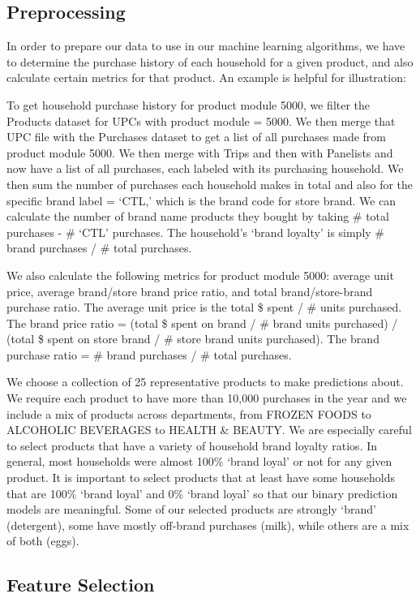 \documentclass[conference]{IEEEtran}
\begin{document}
\subsection{Preprocessing}
In order to prepare our data to use in our machine learning algorithms, we have to determine the purchase history of each household for a given product, and also calculate certain metrics for that product. An example is helpful for illustration: 

To get household purchase history for product module 5000, we filter the Products dataset for UPCs with product module = 5000. We then merge that UPC file with the Purchases dataset to get a list of all purchases made from product module 5000. We then merge with Trips and then with Panelists and now have a list of all purchases, each labeled with its purchasing household. We then sum the number of purchases each household makes in total and also for the specific brand label = ‘CTL,’ which is the brand code for store brand. We can calculate the number of brand name products they bought by taking \# total purchases - \# ‘CTL’ purchases. The household’s ‘brand loyalty’ is simply \# brand purchases / \# total purchases. 


We also calculate the following metrics for product module 5000: average unit price, average brand/store brand price ratio, and total brand/store-brand purchase ratio. The average unit price is the total \$ spent / \# units purchased. The brand price ratio = (total \$ spent on brand / \# brand units purchased) / (total \$ spent on store brand / \# store brand units purchased). The brand purchase ratio = \# brand purchases / \# total purchases.

We choose a collection of 25 representative products to make predictions about. We require each product to have more than 10,000 purchases in the year and we include a mix of products across departments, from FROZEN FOODS to ALCOHOLIC BEVERAGES to HEALTH \& BEAUTY. We are especially careful to select products that have a variety of household brand loyalty ratios. In general, most households were almost 100\% ‘brand loyal’ or not for any given product. It is important to select products that at least have some households that are 100\% ‘brand loyal’ and 0\% ‘brand loyal’ so that our binary prediction models are meaningful. Some of our selected products are strongly ‘brand’ (detergent), some have mostly off-brand purchases (milk), while others are a mix of both (eggs).

\subsection{Feature Selection}
\end{document}
